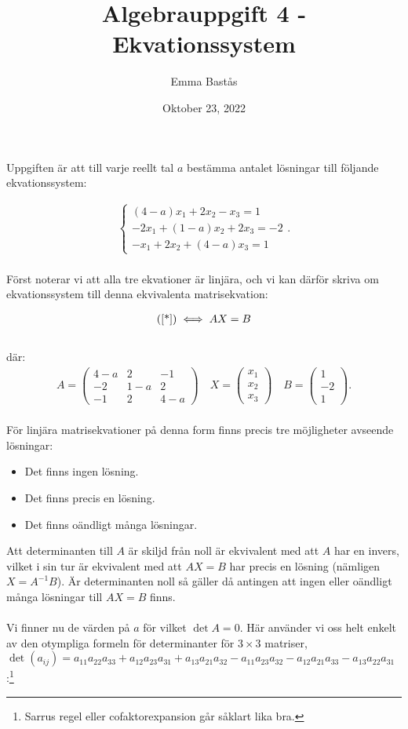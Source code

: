 \documentclass{article}
\title{Algebrauppgift 4 - Ekvationssystem}
\author{Emma Bastås}
\date{Oktober 23, 2022}
\begin{document}
\maketitle

\noindent Uppgiften är att till varje reellt tal $a$ bestämma antalet lösningar till följande ekvationssystem:

\begin{gather*}
  \begin{cases}
  (4 - a)x_{1} + 2x_{2} - x_{3} = 1\\
  -2x_{1} + (1 - a)x_{2} + 2x_{3} = -2\\
  -x_{1} + 2x_{2} + (4 - a)x_{3} = 1
  \end{cases}\text{.} \tag{$\star$}\label{*}
\end{gather*}
\\
Först noterar vi att alla tre ekvationer är linjära, och vi kan därför skriva om ekvationssystem till denna ekvivalenta matrisekvation:

\begin{gather*}
  \text{(\ref{*})} \iff AX = B
\end{gather*}
\\
där:
\begin{gather*}
  A =
  \begin{pmatrix}
    4 - a & 2 & - 1 \\
    -2 & 1 - a & 2 \\
    -1 & 2 & 4 - a
  \end{pmatrix}\quad
  X =
  \begin{pmatrix}
    x_{1} \\
    x_{2} \\
    x_{3}
  \end{pmatrix}\quad
  B =
  \begin{pmatrix}
    1 \\
    -2 \\
    1
  \end{pmatrix}\text{.}
\end{gather*}
\\
För linjära matrisekvationer på denna form finns precis tre möjligheter avseende lösningar:
\begin{itemize}
  \item Det finns ingen lösning.
  \item Det finns precis en lösning.
  \item Det finns oändligt många lösningar.
\end{itemize}

\noindent Att determinanten till $A$ är skiljd från noll är ekvivalent med att $A$ har en invers, vilket i sin tur är ekvivalent med att $AX = B$ har precis en lösning (nämligen $X = A^{-1}B$). Är determinanten noll så gäller då antingen att ingen eller oändligt många lösningar till $AX = B$ finns.
\\
\\
Vi finner nu de värden på $a$ för vilket $\det A = 0$. Här använder vi oss helt enkelt av den otympliga formeln för determinanter för $3\times3$ matriser, $\det (a_{ij}) = a_{11} a_{22} a_{33} + a_{12} a_{23} a_{31} + a_{13} a_{21} a_{32} - a_{11} a_{23} a_{32} - a_{12} a_{21} a_{33} - a_{13} a_{22} a_{31} $:\footnote{Sarrus regel eller cofaktorexpansion går såklart lika bra.}
\end{document}
